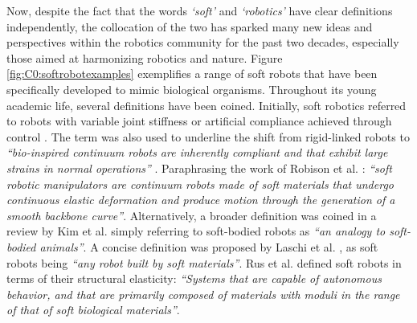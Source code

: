 %
%
Now, despite the fact that the words \emph{`soft'} and \emph{`robotics'} have clear definitions independently, the collocation of the two has sparked many new ideas and perspectives within the robotics community for the past two decades, especially those aimed at harmonizing robotics and nature. Figure \ref{fig:C0:softrobotexamples} exemplifies a range of soft robots that have been specifically developed to mimic biological organisms. Throughout its young academic life, several definitions have been coined. Initially, soft robotics referred to robots with variable joint stiffness \cite{AlbuSchaffer2004} or artificial compliance achieved through control \cite{AlbuSchaffer2011}. The term was also used to underline the shift from rigid-linked robots to \textit{``bio-inspired continuum robots are inherently compliant and that exhibit large strains in normal operations''} \cite{Trivedi2008}. Paraphrasing the work of Robison et al. \cite{Robinson1999}: \textit{``soft robotic manipulators are continuum robots made of soft materials that undergo continuous elastic deformation and produce motion through the generation of a smooth backbone curve''}. Alternatively, a broader definition was coined in a review by Kim et al. \cite{Kim2013} simply referring to soft-bodied robots as \textit{``an analogy to soft-bodied animals''}. A concise definition was proposed by Laschi et al. \cite{Laschi2014}, as soft robots being \textit{``any robot built by soft materials''}. Rus et al. \cite{Rus2015} defined soft robots in terms of their structural elasticity: \textit{``Systems that are capable of autonomous behavior, and that are primarily composed of materials with moduli in the range of that of soft biological materials''}.

